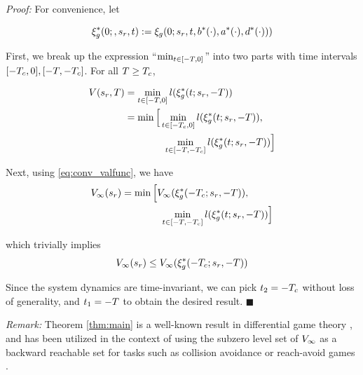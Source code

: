 \textit{Proof:} For convenience, let

\begin{equation}
\xi_g^*(0;, s_r, t) := \xi_g(0; s_r, t, b^*(\cdot), a^*(\cdot), d^*(\cdot)))
\end{equation}

First, we break up the expression ``$\min_{t \in [-T, 0]}$'' into two parts with time intervals $[-T_c, 0], [-T, -T_c]$. For all $T \ge T_c$,
   
   \begin{equation}
   \begin{aligned}
   V(s_r, T) &= \min_{t \in [-T, 0]} l(\xi_g^*(t; s_r, -T)) \\
   &= \min \Big[ \min_{t \in [-T_c, 0]} l(\xi_g^*(t; s_r, -T)), \\
   &\qquad\qquad\min_{t \in [-T, -T_c]} l(\xi_g^*(t; s_r, -T)) \Big]
   \end{aligned}
   \end{equation}
   
   Next, using \eqref{eq:conv_valfunc}, we have
   \begin{equation}
   \begin{aligned}
   V_\infty(s_r) &= \min \Big[ V_\infty(\xi_g^*(-T_c; s_r, -T)), \\
   &\qquad\qquad\min_{t \in [-T, -T_c]} l(\xi_g^*(t; s_r, -T)) \Big]
   \end{aligned}
   \end{equation}
   
   \noindent which trivially implies
   \begin{equation}
   V_\infty(s_r) \le V_\infty(\xi_g^*(-T_c; s_r, -T))
   \end{equation}
   
   Since the system dynamics are time-invariant, we can pick $t_2 = -T_c$ without loss of generality, and $t_1 = -T$ to obtain the desired result. \hfill $\blacksquare$
 
 \textit{Remark:} Theorem \ref{thm:main} is a well-known result in differential game theory \cite{}, and has been utilized in the context of using the subzero level set of $V_\infty$ as a backward reachable set for tasks such as collision avoidance or reach-avoid games \cite{}. 
